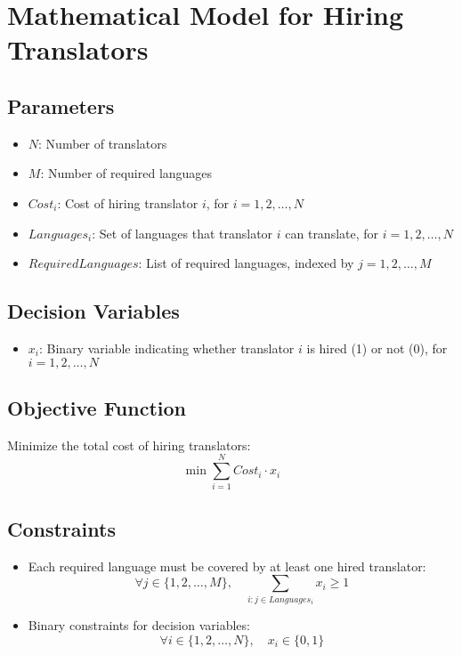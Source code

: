 \documentclass{article}
\begin{document}
\section*{Mathematical Model for Hiring Translators}

\subsection*{Parameters}
\begin{itemize}
    \item $N$: Number of translators
    \item $M$: Number of required languages
    \item $Cost_i$: Cost of hiring translator $i$, for $i = 1, 2, \ldots, N$
    \item $Languages_i$: Set of languages that translator $i$ can translate, for $i = 1, 2, \ldots, N$
    \item $RequiredLanguages$: List of required languages, indexed by $j = 1, 2, \ldots, M$
\end{itemize}

\subsection*{Decision Variables}
\begin{itemize}
    \item $x_i$: Binary variable indicating whether translator $i$ is hired (1) or not (0), for $i = 1, 2, \ldots, N$
\end{itemize}

\subsection*{Objective Function}
Minimize the total cost of hiring translators:
\[
\min \sum_{i=1}^{N} Cost_i \cdot x_i
\]

\subsection*{Constraints}
\begin{itemize}
    \item Each required language must be covered by at least one hired translator:
    \[
    \forall j \in \{1, 2, \ldots, M\}, \quad \sum_{i: j \in Languages_i} x_i \geq 1
    \]
    \item Binary constraints for decision variables:
    \[
    \forall i \in \{1, 2, \ldots, N\}, \quad x_i \in \{0, 1\}
    \]
\end{itemize}
\end{document}
